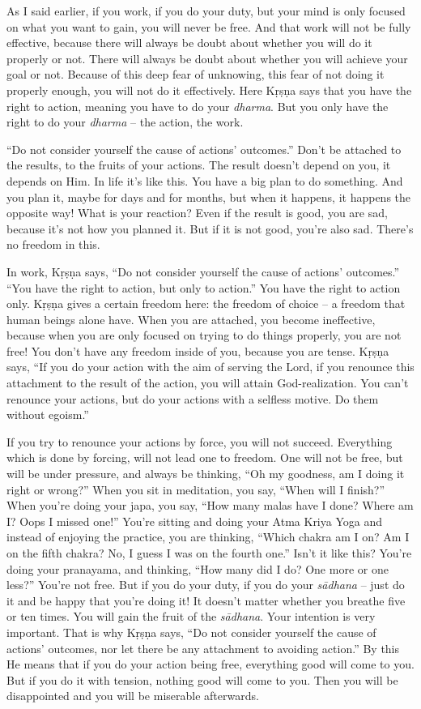 As I said earlier, if you work, if you do your duty, but your mind is only focused on what you want to gain, you will never be free. And that work will not be fully effective, because there will always be doubt about whether you will do it properly or not. There will always be doubt about whether you will achieve your goal or not. Because of this deep fear of unknowing, this fear of not doing it properly enough, you will not do it effectively. Here Kṛṣṇa says that you have the right to action, meaning you have to do your \textit{dharma}. But you only have the right to do your \textit{dharma} – the action, the work.

“Do not consider yourself the cause of actions’ outcomes.” Don’t be attached to the results, to the fruits of your actions. The result doesn’t depend on you, it depends on Him. In life it’s like this. You have a big plan to do something. And you plan it, maybe for days and for months, but when it happens, it happens the opposite way! What is your reaction? Even if the result is good, you are sad, because it’s not how you planned it. But if it is not good, you’re also sad. There’s no freedom in this.

In work, Kṛṣṇa says, “Do not consider yourself the cause of actions’ outcomes.” “You have the right to action, but only to action.” You have the right to action only. Kṛṣṇa gives a certain freedom here: the freedom of choice – a freedom that human beings alone have. When you are attached, you become ineffective, because when you are only focused on trying to do things properly, you are not free! You don’t have any freedom inside of you, because you are tense. Kṛṣṇa says, “If you do your action with the aim of serving the Lord, if you renounce this attachment to the result of the action, you will attain God-realization. You can’t renounce your actions, but do your actions with a selfless motive. Do them without egoism.”

If you try to renounce your actions by force, you will not succeed. Everything which is done by forcing, will not lead one to freedom. One will not be free, but will be under pressure, and always be thinking, “Oh my goodness, am I doing it right or wrong?” When you sit in meditation, you say, “When will I finish?” When you’re doing your japa, you say, “How many malas have I done? Where am I? Oops I missed one!” You’re sitting and doing your Atma Kriya Yoga and instead of enjoying the practice, you are thinking, “Which chakra am I on? Am I on the fifth chakra? No, I guess I was on the fourth one.” Isn’t it like this? You’re doing your pranayama, and thinking, “How many did I do? One more or one less?” You’re not free. But if you do your duty, if you do your \textit{sādhana} – just do it and be happy that you’re doing it! It doesn’t matter whether you breathe five or ten times. You will gain the fruit of the \textit{sādhana}. Your intention is very important. That is why Kṛṣṇa says, “Do not consider yourself the cause of actions’ outcomes, nor let there be any attachment to avoiding action.” By this He means that if you do your action being free, everything good will come to you. But if you do it with tension, nothing good will come to you. Then you will be disappointed and you will be miserable afterwards.

